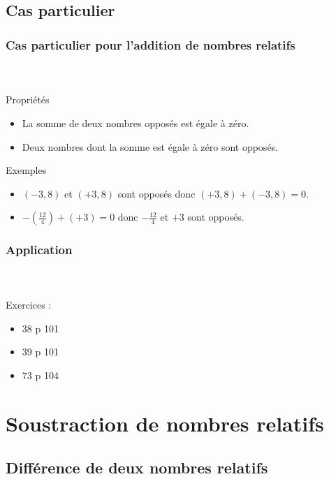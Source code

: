 \documentclass{beamer}
\begin{document}
\subsection{Cas particulier}
\begin{frame}
	\frametitle{Cas particulier pour l'addition de nombres relatifs}  
	\framesubtitle{ \ }	
	
	\begin{block}{Propriétés}
		\begin{itemize}
			\item La somme de deux nombres opposés est égale à zéro.
			\item Deux nombres dont la somme est égale à zéro sont opposés.\pause
		\end{itemize}
	\end{block}
	
	\begin{exampleblock}{Exemples}
		\begin{itemize}
			\item $(-3,8)$  et $(+3,8)$ sont opposés donc $(+3,8) + (-3,8) = 0$.
			\item $-(\frac{12}{4}) + (+3) = 0$ donc $-\frac{12}{4}$  et $+3$ sont opposés.
		\end{itemize}
	\end{exampleblock}
	
\end{frame}

\begin{frame}
	\frametitle{Application}  
	\framesubtitle{ \ }	
	
	Exercices :
	\begin{itemize}
		\item 38 p 101
		\item 39 p 101
		\item 73 p 104
	\end{itemize}
\end{frame}

\section{Soustraction de nombres relatifs}

\subsection{Différence de deux nombres relatifs}
\end{document}
